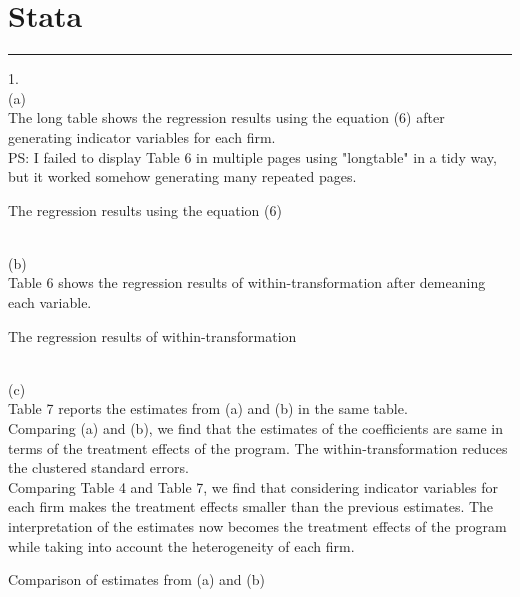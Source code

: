\documentclass{article}
\begin{document}
\noindent
\section{Stata}
\noindent\rule{17cm}{0.4pt}
1. 
\bigskip
\\
(a)
\smallskip
\\
The long table shows the regression results using the equation (6) after generating indicator variables for each firm.
\\
PS: I failed to display Table 6 in multiple pages using "longtable" in a tidy way, but it worked somehow generating many repeated pages. 
\\
\begin{table}[h]
    \small
    \centering
    
    \caption{The regression results using the equation (6)}
    \label{tab:1a_Stata}
\end{table}
\\
\bigskip
(b)
\smallskip
\\
Table 6 shows the regression results of within-transformation after demeaning each variable.
\\
\begin{table}[h]
    \small
    \centering
    
    \caption{The regression results of within-transformation}
    \label{tab:1b_Stata}
\end{table}
\\
\bigskip
(c)
\smallskip
\\
Table 7 reports the estimates from (a) and (b) in the same table. 
\smallskip
\\
Comparing (a) and (b), we find that the estimates of the coefficients are same in terms of the treatment effects of the program. The within-transformation reduces the clustered standard errors.
\smallskip
\\
Comparing Table 4 and Table 7, we find that considering indicator variables for each firm makes the treatment effects smaller than the previous estimates. The interpretation of the estimates now becomes the treatment effects of the program while taking into account the heterogeneity of each firm.  
\\
\begin{table}[h]
    \centering
    
    \caption{Comparison of estimates from (a) and (b)}
    \label{tab:1c_Stata}
\end{table}
\end{document}
